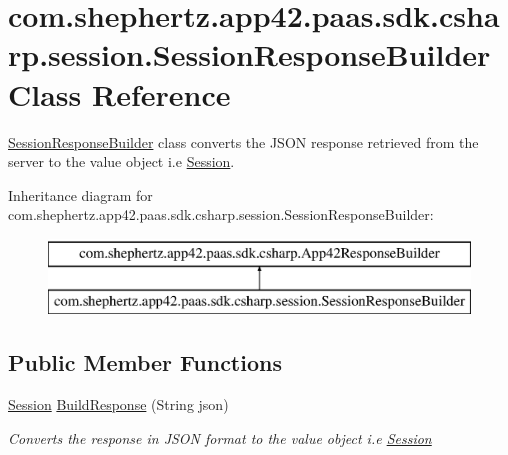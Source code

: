 \hypertarget{classcom_1_1shephertz_1_1app42_1_1paas_1_1sdk_1_1csharp_1_1session_1_1_session_response_builder}{\section{com.\+shephertz.\+app42.\+paas.\+sdk.\+csharp.\+session.\+Session\+Response\+Builder Class Reference}
\label{classcom_1_1shephertz_1_1app42_1_1paas_1_1sdk_1_1csharp_1_1session_1_1_session_response_builder}
}


\hyperlink{classcom_1_1shephertz_1_1app42_1_1paas_1_1sdk_1_1csharp_1_1session_1_1_session_response_builder}{Session\+Response\+Builder} class converts the J\+S\+O\+N response retrieved from the server to the value object i.\+e \hyperlink{classcom_1_1shephertz_1_1app42_1_1paas_1_1sdk_1_1csharp_1_1session_1_1_session}{Session}.  


Inheritance diagram for com.\+shephertz.\+app42.\+paas.\+sdk.\+csharp.\+session.\+Session\+Response\+Builder\+:\begin{figure}[H]
\begin{center}
\leavevmode
\includegraphics[height=2.000000cm]{classcom_1_1shephertz_1_1app42_1_1paas_1_1sdk_1_1csharp_1_1session_1_1_session_response_builder}
\end{center}
\end{figure}
\subsection*{Public Member Functions}
\begin{DoxyCompactItemize}
\item 
\hyperlink{classcom_1_1shephertz_1_1app42_1_1paas_1_1sdk_1_1csharp_1_1session_1_1_session}{Session} \hyperlink{classcom_1_1shephertz_1_1app42_1_1paas_1_1sdk_1_1csharp_1_1session_1_1_session_response_builder_a89a11f1fe5763a3c922c955b679c0bf1}{Build\+Response} (String json)
\begin{DoxyCompactList}\small\item\em Converts the response in J\+S\+O\+N format to the value object i.\+e \hyperlink{classcom_1_1shephertz_1_1app42_1_1paas_1_1sdk_1_1csharp_1_1session_1_1_session}{Session} \end{DoxyCompactList}\end{DoxyCompactItemize}


